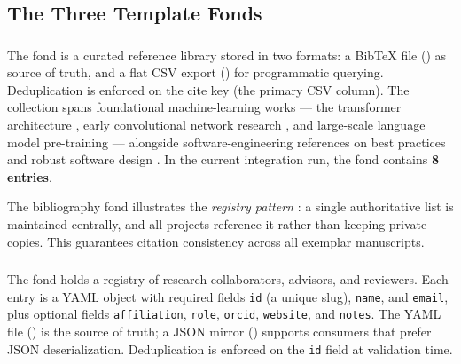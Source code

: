 \documentclass[
]{article}
\begin{document}
\subsection{The Three Template Fonds}\label{the-three-template-fonds}

\subsubsection{\texorpdfstring{}{template_bibliography}}\label{template_bibliography}

The  fond is a curated reference library
stored in two formats: a BibTeX file () as
source of truth, and a flat CSV export ()
for programmatic querying. Deduplication is enforced on the cite key
(the primary CSV column). The collection spans foundational
machine-learning works --- the transformer architecture
\citep{Vaswani2017attention}, early convolutional network research
\citep{LeCun1998gradient}, and large-scale language model pre-training
\citep{Brown2020gpt3} --- alongside software-engineering references on
best practices \citep{Wilson2014best} and robust software design
\citep{Taschuk2017ten}. In the current integration run, the fond
contains \textbf{8 entries}.

The bibliography fond illustrates the \emph{registry pattern}
\citep{Fowler2002patterns}: a single authoritative list is maintained
centrally, and all projects reference it rather than keeping private
copies. This guarantees citation consistency across all exemplar
manuscripts.

\subsubsection{\texorpdfstring{}{template_contacts}}\label{template_contacts}

The  fond holds a registry of research
collaborators, advisors, and reviewers. Each entry is a YAML object with
required fields \texttt{id} (a unique slug), \texttt{name}, and
\texttt{email}, plus optional fields \texttt{affiliation},
\texttt{role}, \texttt{orcid}, \texttt{website}, and \texttt{notes}. The
YAML file () is the source of truth; a JSON
mirror () supports consumers that prefer JSON
deserialization. Deduplication is enforced on the \texttt{id} field at
validation time.
\end{document}
